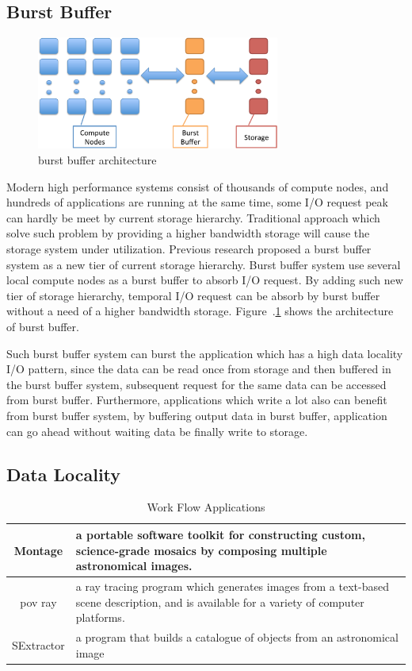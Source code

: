 \subsection{Burst Buffer}
\begin{figure}
\centering
\includegraphics[width=8cm]{img/burst_buffer.pdf}
\caption{burst buffer architecture}
\label{background:burst buffer architecture}
\end{figure}

Modern high performance systems consist of thousands of compute nodes, and hundreds of
applications are running at the same time, some I/O request peak can hardly be meet by current
storage hierarchy. 
Traditional approach which solve such problem by providing a higher bandwidth storage will cause
the storage system under utilization.
Previous research\cite{on_the_role_of_burst_buffers} proposed a
burst buffer system as a new tier of current storage hierarchy.
Burst buffer system use several local compute nodes as a burst buffer to absorb I/O
request. 
By adding such new tier of storage hierarchy, temporal I/O request can be absorb by burst buffer
without a need of a higher bandwidth storage. Figure~.\ref{background:burst buffer architecture}
shows the architecture of burst buffer.

Such burst buffer system can burst the application which has a high data locality I/O pattern, since
the data can be read once from storage and then buffered in the burst buffer system, subsequent
request for the same data can be accessed from burst buffer.
Furthermore, applications which write a lot also can benefit from burst buffer system, by buffering
output data in burst buffer, application can go ahead without waiting data be finally write to
storage.

\subsection{Data Locality}

\begin{table}
\centering
\begin{tabular}{|c|p{150pt}|}
\hline
Montage		&		a portable software toolkit for constructing custom, science-grade 
mosaics by composing multiple astronomical images\cite{montage}.\\\hline
pov ray		&		a ray tracing program which generates images from a text-based scene description, and is
available for a variety of computer platforms\cite{povray}.\\\hline
SExtractor	&	a program that builds a catalogue of objects from an astronomical image	\\
\hline
\end{tabular}
\caption{Work Flow Applications}
\label{background:work flow applications}
\end{table}


